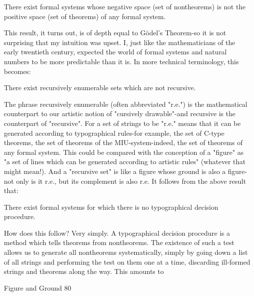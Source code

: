       There exist formal systems whose negative space (set of nontheorems) is not
      the positive space (set of theorems) of any formal system.

        This result, it turns out, is of depth equal to Gödel’s Theorem-so it is not
surprising that my intuition was upset. I, just like the mathematicians of the early
twentieth century, expected the world of formal systems and natural numbers to be more
predictable than it is. In more technical terminology, this becomes:

       There exist recursively enumerable sets which are not recursive.

The phrase recursively enumerable (often abbreviated "r.e.") is the mathematical
counterpart to our artistic notion of "cursively drawable"-and recursive is the counterpart
of "recursive". For a set of strings to be "r.e." means that it can be generated according to
typographical rules-for example, the set of C-type theorems, the set of theorems of the
MIU-system-indeed, the set of theorems of any formal system. This could be compared
with the conception of a "figure" as "a set of lines which can be generated according to
artistic rules" (whatever that might mean!). And a "recursive set" is like a figure whose
ground is also a figure-not only is it r.e., but its complement is also r.e.
         It follows from the above result that:

      There exist formal systems for which there is no typographical decision
      procedure.

       How does this follow? Very simply. A typographical decision procedure is a
method which tells theorems from nontheorems. The existence of such a test allows us to
generate all nontheorems systematically, simply by going down a list of all strings and
performing the test on them one at a time, discarding ill-formed strings and theorems
along the way. This amounts to




Figure and Ground                                                                         80

